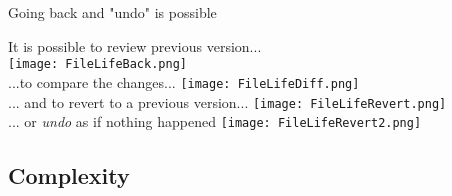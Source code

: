 \documentclass[xcolor=x11names,compress]{beamer}
\renewcommand{\(}{\begin{columns}}
\renewcommand{\)}{\end{columns}}
\newcommand{\<}[1]{\begin{column}{#1}}
\renewcommand{\>}{\end{column}}
\begin{document}
\begin{frame}{Going back and "undo" is possible}
\begin{center}
\begin{itemize}
    {It is possible to review previous version... \\ }
    {\texttt{[image: FileLifeBack.png]} \\ }
    {...to compare the changes...  }
    {\texttt{[image: FileLifeDiff.png]} \\ }
    {... and to revert  to a  previous version... }
    {\texttt{[image: FileLifeRevert.png]} \\ }
    {... or \emph{undo} as if nothing happened }
    {\texttt{[image: FileLifeRevert2.png]} \\ }

\end{itemize}
\end{center}
\end{frame}

\subsection{Complexity}
\end{document}
